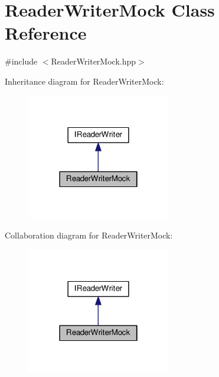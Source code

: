 \hypertarget{classReaderWriterMock}{}\section{Reader\+Writer\+Mock Class Reference}
\label{classReaderWriterMock}


{\ttfamily \#include $<$Reader\+Writer\+Mock.\+hpp$>$}



Inheritance diagram for Reader\+Writer\+Mock\+:
\nopagebreak
\begin{figure}[H]
\begin{center}
\leavevmode
\includegraphics[width=178pt]{classReaderWriterMock__inherit__graph}
\end{center}
\end{figure}


Collaboration diagram for Reader\+Writer\+Mock\+:
\nopagebreak
\begin{figure}[H]
\begin{center}
\leavevmode
\includegraphics[width=178pt]{classReaderWriterMock__coll__graph}
\end{center}
\end{figure}
